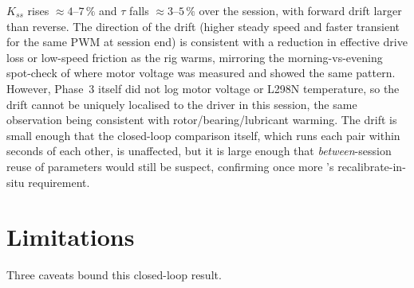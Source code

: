 $K_{ss}$ rises ${\approx}4$--$7\,\%$ and $\tau$ falls ${\approx}3$--$5\,\%$ over the session, with forward drift larger than reverse. The direction of the drift (higher steady speed and faster transient for the same PWM at session end) is consistent with a reduction in effective drive loss or low-speed friction as the rig warms, mirroring the morning-vs-evening spot-check of  where motor voltage was measured and showed the same pattern. However, Phase~3 itself did not log motor voltage or L298N temperature, so the drift cannot be uniquely localised to the driver in this session, the same observation being consistent with rotor/bearing/lubricant warming. The drift is small enough that the closed-loop comparison itself, which runs each pair within seconds of each other, is unaffected, but it is large enough that \emph{between}-session reuse of parameters would still be suspect, confirming once more 's recalibrate-in-situ requirement.

\section{Limitations}
\label{sec:cl-limits}

Three caveats bound this closed-loop result.

